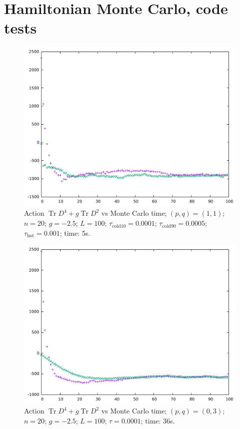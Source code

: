 \documentclass[12pt,a4paper]{article}
\DeclareMathOperator{\Tr}{Tr}
\begin{document}
\section{Hamiltonian Monte Carlo, code tests}

\begin{figure}[!htb]
\includegraphics[width=1\linewidth]{p1q1n20g25.pdf}
\caption{Action $\Tr D^4 + g\Tr D^2$ vs Monte Carlo time; $(p,q)=(1,1)$; $n=20$; $g=-2.5$; $L=100$; $\tau_\text{cold10} = 0.0001$; $\tau_\text{cold90} = 0.0005$; $\tau_\text{hot} = 0.001$; time: 5s.}
\end{figure}

\begin{figure}[!htb]
\includegraphics[width=1\linewidth]{p0q3n20g25.pdf}
\caption{Action $\Tr D^4 + g\Tr D^2$ vs Monte Carlo time; $(p,q)=(0,3)$; $n=20$; $g=-2.5$; $L=100$; $\tau = 0.0001$; time: 36s.}
\end{figure}
\end{document}
